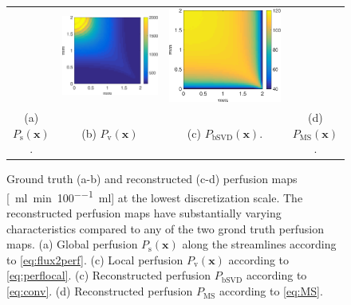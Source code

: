 \documentclass[final,5p,times,twocolumn]{elsarticle}
\begin{document}
\begin{figure}[h!tb]
\begin{tabular}{c c c c}
		& \includegraphics[width=\fwd]{figs/E110_CBFOnDifferentResolutions_plot-bSVD-scaleto-none-raw.eps}
		& \includegraphics[width=\fwd]{figs/E110_CBFOnDifferentResolutions_plot-MS-scaleto-none-raw.eps}\\
		(a) $P_{\mathrm{s}}(\mathbf{x})$. & (b) $P_{\mathrm{v}}(\mathbf{x})$ & (c) $P_{\mathrm{bSVD}}(\mathbf{x})$. & (d) $P_{\mathrm{MS}}(\mathbf{x})$.
	\end{tabular}
	\caption{Ground truth (a-b) and reconstructed (c-d) perfusion maps [\SI{}{\milli\litre\per\minute\per 100\milli\litre}] at the lowest discretization scale. The reconstructed perfusion maps have substantially varying characteristics compared to any of the two grond truth perfusion maps. (a) Global perfusion $P_{\mathrm{s}}(\mathbf{x})$ along the streamlines according to \eqref{eq:flux2perf}. (c) Local perfusion $P_{\mathrm{v}}(\mathbf{x})$ according to \eqref{eq:perflocal}. (c) Reconstructed perfusion $P_{\mathrm{bSVD}}$ according to \eqref{eq:conv}. (d) Reconstructed perfusion $P_{\mathrm{MS}}$ according to \eqref{eq:MS}.} 
        \label{fig:perfusionmaps}
\end{figure}	
\end{document}
